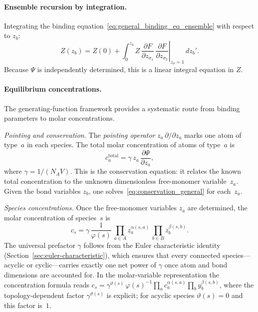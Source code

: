\documentclass[11pt]{amsart}
\newcommand{\GFspecies}{F}
\newcommand{\GFensemble}{Z}
\newcommand{\GFcomb}{\Psi}
\newcommand{\PDeriv}[2]{\frac{\partial #1}{\partial #2}}
\theoremstyle{definition}
\theoremstyle{plain}
\theoremstyle{remark}
\begin{document}
\paragraph{Ensemble recursion by integration.}
Integrating the binding equation~\eqref{eq:general_binding_eq_ensemble} with respect to $z_b$:
\begin{equation}\label{eq:ensemble_recursion_general}
\GFensemble(z_b) = \GFensemble(0) + \int_0^{z_b} \GFensemble\,\left.\PDeriv{\GFspecies}{z_{\sigma_1}}\,\PDeriv{\GFspecies}{z_{\sigma_2}}\right|_{z_\sigma=1}\,dz_b'.
\end{equation}
Because $\GFcomb$ is independently determined, this is a linear integral equation in $\GFensemble$.

\paragraph{Equilibrium concentrations.}
The generating-function framework provides a systematic route from binding parameters to molar concentrations.

\emph{Pointing and conservation.}
The \emph{pointing operator} $z_a\,\partial/\partial z_a$ marks one atom of type~$a$ in each species.
The total molar concentration of atoms of type~$a$ is
\begin{equation}\label{eq:conservation_general}
c_a^{\mathrm{total}} = \gamma\,z_a\,\PDeriv{\GFcomb}{z_a},
\end{equation}
where $\gamma = 1/(N_A V)$.
This is the conservation equation: it relates the known total concentration to the unknown dimensionless free-monomer variable~$z_a$.
Given the bond variables $z_b$, one solves~\eqref{eq:conservation_general} for each~$z_a$.

\emph{Species concentrations.}
Once the free-monomer variables $z_a$ are determined, the molar concentration of species~$s$ is
\begin{equation}\label{eq:concentration_general}
c_s = \gamma\,\frac{1}{\varphi(s)}\,
\prod_{a\in A} z_a^{\alpha(s,a)}\,
\prod_{b\in B} z_b^{\beta(s,b)}.
\end{equation}
The universal prefactor $\gamma$ follows from the Euler characteristic identity (Section~\ref{sec:euler-characteristic}), which ensures that every connected species---acyclic or cyclic---carries exactly one net power of $\gamma$ once atom and bond dimensions are accounted for.
In the molar-variable representation the concentration formula reads $c_s = \gamma^{\vartheta(s)}\,\varphi(s)^{-1}\prod_a c_a^{\alpha(s,a)}\prod_b y_b^{\beta(s,b)}$, where the topology-dependent factor $\gamma^{\vartheta(s)}$ is explicit; for acyclic species $\vartheta(s)=0$ and this factor is~$1$.
\end{document}
